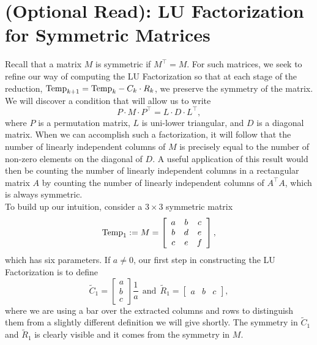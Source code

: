 \section{(Optional Read): LU Factorization for Symmetric Matrices}
\label{sec:LUsymmetric}

Recall that a matrix $M$ is symmetric if $M^\top = M$. For such matrices, we seek to refine our way of computing the LU Factorization so that at each stage of the reduction, ${\rm Temp}_{k+1} = {\rm Temp}_{k}-C_k \cdot R_k$, we preserve the symmetry of the matrix. We will discover a condition that will allow us to write
\begin{equation}
    \label{eq:PMPtransFormLU}
     P \cdot M \cdot P^\top = L \cdot D \cdot L^\top, 
\end{equation}
where $P$ is a permutation matrix, $L$ is uni-lower triangular, and $D$ is a diagonal matrix. When we can accomplish such a factorization, it will follow that the number of linearly independent columns of $M$ is precisely equal to the number of non-zero elements on the diagonal of $D$. A useful application of this result would then be counting the number of linearly independent columns in a rectangular matrix $A$ by counting the number of linearly independent columns of $A^\top A$, which is always symmetric. \\

To build up our intuition, consider a $3 \times 3$ symmetric matrix
\begin{equation}
    \label{eq:SymmetricM}
  {\rm Temp}_{1}:= M= \left[\begin{array}{ccc} 
   a & b & c\\
   b & d & e\\
   c & e & f
   \end{array}\right],
\end{equation}
   which has six parameters.
If $a\neq 0$, our first step in constructing the LU Factorization is to define
\begin{equation}
    \label{eq:SymmetricM_LUStep1a}
   \tilde{C}_1= \left[\begin{array}{c} 
   a \\  b \\ c 
   \end{array}\right] \frac{1}{a}~~\text{and}~~\tilde{R}_1=\left[\begin{array}{ccc}
   a & b & c
   \end{array}\right],
\end{equation}
where we are using a bar over the extracted columns and rows to distinguish them from a slightly different definition we will give shortly. The symmetry in $\tilde{C}_1$ and $\tilde{R}_1$ is clearly visible and it comes from the symmetry in $M$.\\

